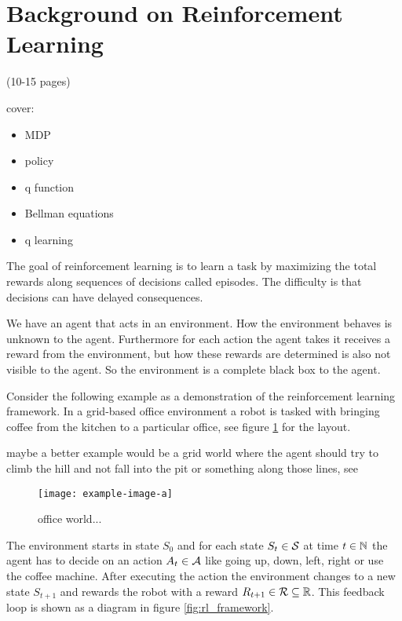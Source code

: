 \section{Background on Reinforcement Learning}

\begin{notes}
    (10-15 pages)

    cover:
    \begin{itemize}
        \item MDP
        \item policy
        \item q function
        \item Bellman equations
        \item q learning
    \end{itemize}
\end{notes}

The goal of reinforcement learning is to learn a task by maximizing the total rewards along sequences of decisions called episodes. The difficulty is that decisions can have delayed consequences. 

We have an agent that acts in an environment. How the environment behaves is unknown to the agent. Furthermore for each action the agent takes it receives a reward from the environment, but how these rewards are determined is also not visible to the agent. So the environment is a complete black box to the agent.

Consider the following example as a demonstration of the reinforcement learning framework. In a grid-based office environment a robot is tasked with bringing coffee from the kitchen to a particular office, see figure \ref{fig:officegrid} for the layout.
\begin{notes}
    maybe a better example would be a grid world where the agent should try to climb the hill and not fall into the pit or something along those lines, see \cite{RL2018}
\end{notes}

\begin{figure}[h]
    \centering
    \texttt{[image: example-image-a]}
    \caption{office world... \todo}
    \label{fig:officegrid}
\end{figure}

The environment starts in state $S_0$ and for each state $S_t \in \S$ at time $t \in \N$ the agent has to decide on an action $A_t \in \A$ like going up, down, left, right or use the coffee machine. After executing the action the environment changes to a new state $S_{t+1}$ and rewards the robot with a reward $R_{t+1} \in \calR \subseteq \R$. This feedback loop is shown as a diagram in figure \ref{fig:rl_framework}.

